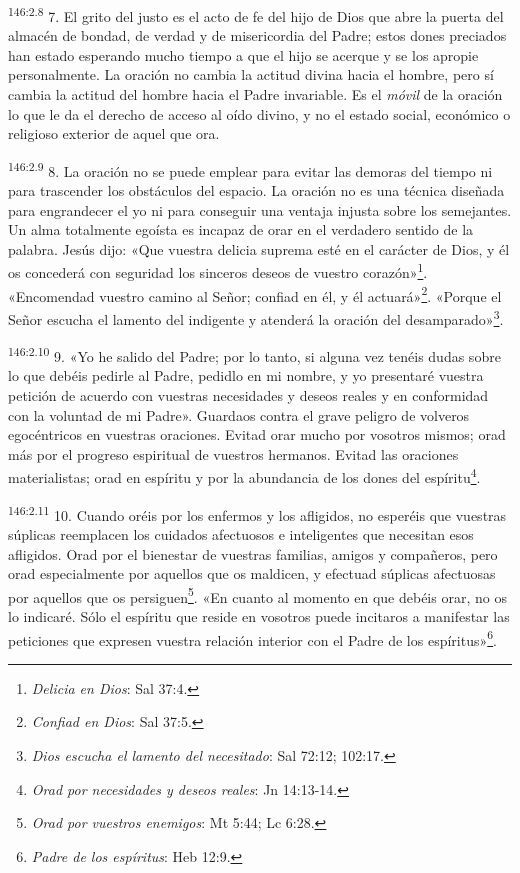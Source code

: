 \par
\textsuperscript{146:2.8} 7. El grito del justo es el acto de fe del hijo de Dios que abre la puerta del almacén de bondad, de verdad y de misericordia del Padre; estos dones preciados han estado esperando mucho tiempo a que el hijo se acerque y se los apropie personalmente. La oración no cambia la actitud divina hacia el hombre, pero sí cambia la actitud del hombre hacia el Padre invariable. Es el \textit{móvil} de la oración lo que le da el derecho de acceso al oído divino, y no el estado social, económico o religioso exterior de aquel que ora.

\par
\textsuperscript{146:2.9} 8. La oración no se puede emplear para evitar las demoras del tiempo ni para trascender los obstáculos del espacio. La oración no es una técnica diseñada para engrandecer el yo ni para conseguir una ventaja injusta sobre los semejantes. Un alma totalmente egoísta es incapaz de orar en el verdadero sentido de la palabra. Jesús dijo: «Que vuestra delicia suprema esté en el carácter de Dios, y él os concederá con seguridad los sinceros deseos de vuestro corazón»\footnote{\textit{Delicia en Dios}: Sal 37:4.}. «Encomendad vuestro camino al Señor; confiad en él, y él actuará»\footnote{\textit{Confiad en Dios}: Sal 37:5.}. «Porque el Señor escucha el lamento del indigente y atenderá la oración del desamparado»\footnote{\textit{Dios escucha el lamento del necesitado}: Sal 72:12; 102:17.}.

\par
\textsuperscript{146:2.10} 9. «Yo he salido del Padre; por lo tanto, si alguna vez tenéis dudas sobre lo que debéis pedirle al Padre, pedidlo en mi nombre, y yo presentaré vuestra petición de acuerdo con vuestras necesidades y deseos reales y en conformidad con la voluntad de mi Padre». Guardaos contra el grave peligro de volveros egocéntricos en vuestras oraciones. Evitad orar mucho por vosotros mismos; orad más por el progreso espiritual de vuestros hermanos. Evitad las oraciones materialistas; orad en espíritu y por la abundancia de los dones del espíritu\footnote{\textit{Orad por necesidades y deseos reales}: Jn 14:13-14.}.

\par
\textsuperscript{146:2.11} 10. Cuando oréis por los enfermos y los afligidos, no esperéis que vuestras súplicas reemplacen los cuidados afectuosos e inteligentes que necesitan esos afligidos. Orad por el bienestar de vuestras familias, amigos y compañeros, pero orad especialmente por aquellos que os maldicen, y efectuad súplicas afectuosas por aquellos que os persiguen\footnote{\textit{Orad por vuestros enemigos}: Mt 5:44; Lc 6:28.}. «En cuanto al momento en que debéis orar, no os lo indicaré. Sólo el espíritu que reside en vosotros puede incitaros a manifestar las peticiones que expresen vuestra relación interior con el Padre de los espíritus»\footnote{\textit{Padre de los espíritus}: Heb 12:9.}.

